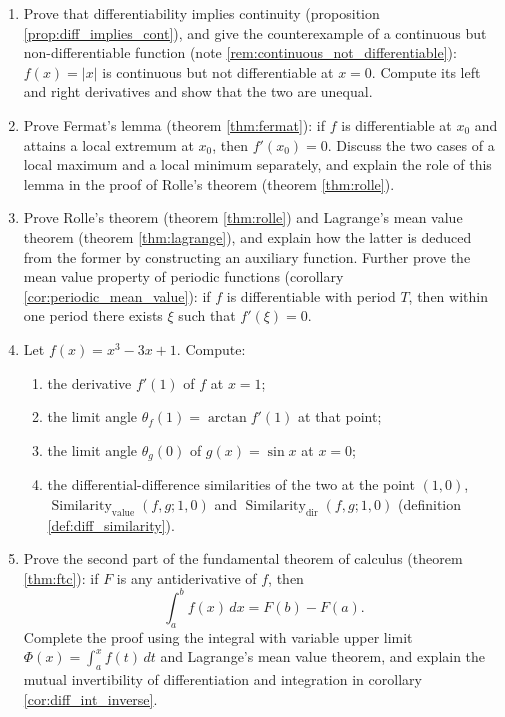 \begin{enumerate}[leftmargin=3em, label=\textbf{Exercise \arabic*}]
    \item Prove that differentiability implies continuity (proposition \ref{prop:diff_implies_cont}),
    and give the counterexample of a continuous but non-differentiable function (note \ref{rem:continuous_not_differentiable}):
    $f(x)=|x|$ is continuous but not differentiable at $x=0$.
    Compute its left and right derivatives and show that the two are unequal.

    \item Prove Fermat's lemma (theorem \ref{thm:fermat}):
    if $f$ is differentiable at $x_0$ and attains a local extremum at $x_0$, then $f'(x_0)=0$.
    Discuss the two cases of a local maximum and a local minimum separately,
    and explain the role of this lemma in the proof of Rolle's theorem (theorem \ref{thm:rolle}).

    \item Prove Rolle's theorem (theorem \ref{thm:rolle}) and Lagrange's mean value theorem (theorem \ref{thm:lagrange}),
    and explain how the latter is deduced from the former by constructing an auxiliary function.
    Further prove the mean value property of periodic functions (corollary \ref{cor:periodic_mean_value}):
    if $f$ is differentiable with period $T$, then within one period there exists $\xi$ such that $f'(\xi)=0$.

    \item Let $f(x)=x^3-3x+1$. Compute:
    \begin{enumerate}[label=(\roman*)]
        \item the derivative $f'(1)$ of $f$ at $x=1$;
        \item the limit angle $\theta_f(1)=\arctan f'(1)$ at that point;
        \item the limit angle $\theta_g(0)$ of $g(x)=\sin x$ at $x=0$;
        \item the differential-difference similarities of the two at the point $(1,0)$,
              $\operatorname{Similarity}_{\text{value}}(f,g;1,0)$ and
              $\operatorname{Similarity}_{\text{dir}}(f,g;1,0)$ (definition \ref{def:diff_similarity}).
    \end{enumerate}

    \item Prove the second part of the fundamental theorem of calculus (theorem \ref{thm:ftc}):
    if $F$ is any antiderivative of $f$, then
    \[
    \int_a^b f(x)\,dx=F(b)-F(a).
    \]
    Complete the proof using the integral with variable upper limit $\Phi(x)=\int_a^x f(t)\,dt$ and Lagrange's mean value theorem,
    and explain the mutual invertibility of differentiation and integration in corollary \ref{cor:diff_int_inverse}.


\end{enumerate}
